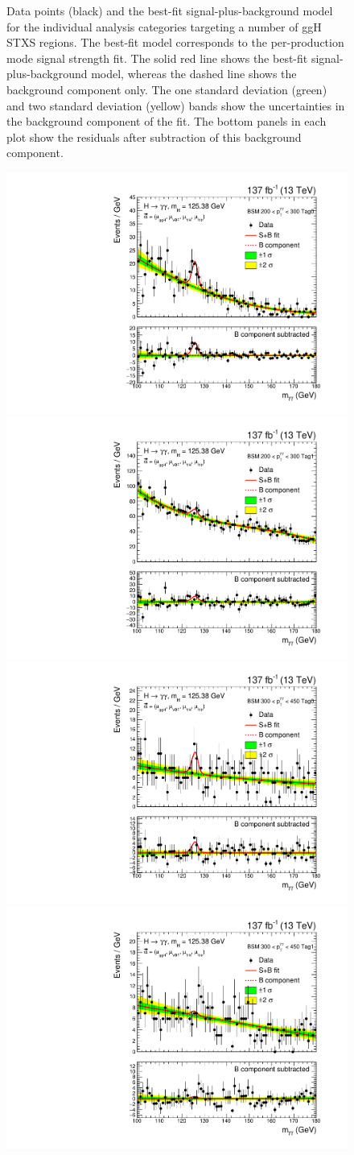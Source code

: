 \begin{figure}
  \caption[Observed diphoton mass distributions: ggH 1J and ggH $\geq$2J]
  {
    Data points (black) and the best-fit signal-plus-background model for the individual analysis categories targeting a number of ggH STXS regions. The best-fit model corresponds to the per-production mode signal strength fit. The solid red line shows the best-fit signal-plus-background model, whereas the dashed line shows the background component only. The one standard deviation (green) and two standard deviation (yellow) bands show the uncertainties in the background component of the fit. The bottom panels in each plot show the residuals after subtraction of this background component.
  }
  \label{fig:diphoton_mass_1}
\end{figure}


\begin{figure}
  \centering
  \includegraphics[width=.32\linewidth]{Figures/app_sb_models/RECO_PTH_200_300_Tag0_CMS_hgg_mass.pdf}
  \includegraphics[width=.32\linewidth]{Figures/app_sb_models/RECO_PTH_200_300_Tag1_CMS_hgg_mass.pdf}
  \includegraphics[width=.32\linewidth]{Figures/app_sb_models/RECO_PTH_300_450_Tag0_CMS_hgg_mass.pdf}
  \includegraphics[width=.32\linewidth]{Figures/app_sb_models/RECO_PTH_300_450_Tag1_CMS_hgg_mass.pdf}

\end{figure}
